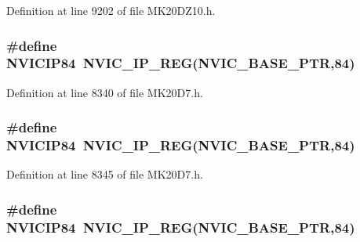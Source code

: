 Definition at line 9202 of file M\+K20\+D\+Z10.\+h.

\subsubsection[{\texorpdfstring{N\+V\+I\+C\+I\+P84}{NVICIP84}}]{\setlength{\rightskip}{0pt plus 5cm}\#define N\+V\+I\+C\+I\+P84~{\bf N\+V\+I\+C\+\_\+\+I\+P\+\_\+\+R\+EG}({\bf N\+V\+I\+C\+\_\+\+B\+A\+S\+E\+\_\+\+P\+TR},84)}\hypertarget{group___n_v_i_c___register___accessor___macros_gac6dc0257943cc565b068c8f271068183}{}\label{group___n_v_i_c___register___accessor___macros_gac6dc0257943cc565b068c8f271068183}


Definition at line 8340 of file M\+K20\+D7.\+h.

\subsubsection[{\texorpdfstring{N\+V\+I\+C\+I\+P84}{NVICIP84}}]{\setlength{\rightskip}{0pt plus 5cm}\#define N\+V\+I\+C\+I\+P84~{\bf N\+V\+I\+C\+\_\+\+I\+P\+\_\+\+R\+EG}({\bf N\+V\+I\+C\+\_\+\+B\+A\+S\+E\+\_\+\+P\+TR},84)}\hypertarget{group___n_v_i_c___register___accessor___macros_gac6dc0257943cc565b068c8f271068183}{}\label{group___n_v_i_c___register___accessor___macros_gac6dc0257943cc565b068c8f271068183}


Definition at line 8345 of file M\+K20\+D7.\+h.

\subsubsection[{\texorpdfstring{N\+V\+I\+C\+I\+P84}{NVICIP84}}]{\setlength{\rightskip}{0pt plus 5cm}\#define N\+V\+I\+C\+I\+P84~{\bf N\+V\+I\+C\+\_\+\+I\+P\+\_\+\+R\+EG}({\bf N\+V\+I\+C\+\_\+\+B\+A\+S\+E\+\_\+\+P\+TR},84)}\hypertarget{group___n_v_i_c___register___accessor___macros_gac6dc0257943cc565b068c8f271068183}{}\label{group___n_v_i_c___register___accessor___macros_gac6dc0257943cc565b068c8f271068183}



